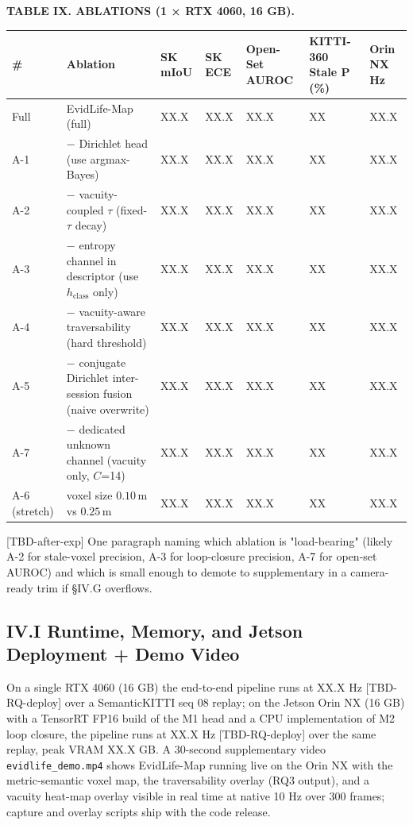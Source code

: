 \documentclass[
]{article}
\newcounter{none} %
\begin{document}
\textbf{TABLE IX. ABLATIONS (1 × RTX 4060, 16 GB).}

{\def\LTcaptype{none} %
\begin{longtable}[]{@{}lllllll@{}}
\toprule\noalign{}
\# & Ablation & SK mIoU & SK ECE & Open-Set AUROC & KITTI-360 Stale P
(\%) & Orin NX Hz \\
\midrule\noalign{}
\endhead
\bottomrule\noalign{}
\endlastfoot
Full & EvidLife-Map (full) & XX.X & XX.X & XX.X & XX & XX.X \\
A-1 & \(-\) Dirichlet head (use argmax-Bayes) & XX.X & XX.X & XX.X & XX
& XX.X \\
A-2 & \(-\) vacuity-coupled \(\tau\) (fixed-\(\tau\) decay) & XX.X &
XX.X & XX.X & XX & XX.X \\
A-3 & \(-\) entropy channel in descriptor (use \(h_{\text{class}}\)
only) & XX.X & XX.X & XX.X & XX & XX.X \\
A-4 & \(-\) vacuity-aware traversability (hard threshold) & XX.X & XX.X
& XX.X & XX & XX.X \\
A-5 & \(-\) conjugate Dirichlet inter-session fusion (naive overwrite) &
XX.X & XX.X & XX.X & XX & XX.X \\
A-7 & \(-\) dedicated unknown channel (vacuity only, \(C\)=14) & XX.X &
XX.X & XX.X & XX & XX.X \\
A-6 (stretch) & voxel size \(0.10\,\text{m}\) vs \(0.25\,\text{m}\) &
XX.X & XX.X & XX.X & XX & XX.X \\
\end{longtable}
}

{[}TBD-after-exp{]} One paragraph naming which ablation is
"load-bearing" (likely A-2 for stale-voxel precision, A-3 for
loop-closure precision, A-7 for open-set AUROC) and which is small
enough to demote to supplementary in a camera-ready trim if §IV.G
overflows.

\subsection{IV.I Runtime, Memory, and Jetson Deployment + Demo
Video}\label{ivi-runtime-memory-and-jetson-deployment--demo-video}

On a single RTX 4060 (16 GB) the end-to-end pipeline runs at XX.X Hz
{[}TBD-RQ-deploy{]} over a SemanticKITTI seq 08 replay; on the Jetson
Orin NX (16 GB) with a TensorRT FP16 build of the M1 head and a CPU
implementation of M2 loop closure, the pipeline runs at XX.X Hz
{[}TBD-RQ-deploy{]} over the same replay, peak VRAM XX.X GB. A 30-second
supplementary video \texttt{evidlife\_demo.mp4} shows EvidLife-Map
running live on the Orin NX with the metric-semantic voxel map, the
traversability overlay (RQ3 output), and a vacuity heat-map overlay
visible in real time at native 10 Hz over 300 frames; capture and
overlay scripts ship with the code release.
\end{document}
